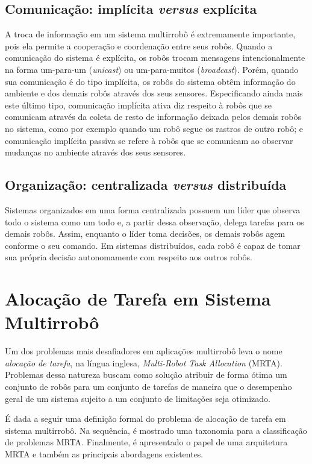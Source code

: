         \subsection{Comunicação: implícita \textit{versus} explícita}
            A troca de informação em um sistema multirrobô é extremamente importante, pois ela permite a cooperação e coordenação entre seus robôs. Quando a comunicação do sistema é explícita, os robôs trocam mensagens intencionalmente na forma um-para-um (\textit{unicast}) ou um-para-muitos (\textit{broadcast}). Porém, quando sua comunicação é do tipo implícita, os robôs do sistema obtêm informação do ambiente e dos demais robôs através dos seus sensores. Especificando ainda mais este último tipo, comunicação implícita ativa diz respeito à robôs que se comunicam através da coleta de resto de informação deixada pelos demais robôs no sistema, como por exemplo quando um robô segue os rastros de outro robô; e comunicação implícita passiva se refere à robôs que se comunicam ao observar mudanças no ambiente através dos seus sensores.
        
        \subsection{Organização: centralizada \textit{versus} distribuída}
            Sistemas organizados em uma forma centralizada possuem um líder que observa todo o sistema como um todo e, a partir dessa observação, delega tarefas para os demais robôs. Assim, enquanto o líder toma decisões, os demais robôs agem conforme o seu comando. Em sistemas distribuídos, cada robô é capaz de tomar sua própria decisão autonomamente com respeito aos outros robôs. 
    
    \section{Alocação de Tarefa em Sistema Multirrobô} \label{sec:mrta}
        Um dos problemas mais desafiadores em aplicações multirrobô leva o nome \textit{alocação de tarefa}, na língua inglesa, \textit{Multi-Robot Task Allocation} (MRTA). Problemas dessa natureza buscam como solução atribuir de forma ótima um conjunto de robôs para um conjunto de tarefas de maneira que o desempenho geral de um sistema sujeito a um conjunto de limitações seja otimizado.
        
        É dada a seguir uma definição formal do problema de alocação de tarefa em sistema multirrobô. Na sequência, é mostrado uma taxonomia para a classificação de problemas MRTA. Finalmente, é apresentado o papel de uma arquitetura MRTA e também as principais abordagens existentes.
        
